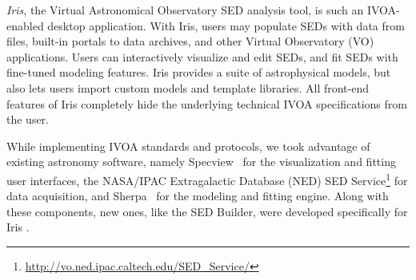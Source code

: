 \documentclass[preprint,authoryear,5p]{elsarticle}
\begin{document}
\textit{Iris}, the Virtual Astronomical Observatory \citep[VAO;][]{2012SPIE.8449E..0HB}
SED analysis tool, is such an IVOA-enabled desktop application. 
With Iris, users may populate SEDs with data from files, built-in portals to data
archives, and other Virtual Observatory (VO) applications. Users can
interactively visualize and edit SEDs, and fit SEDs with fine-tuned modeling
features. Iris provides a suite of astrophysical models, but also lets users
import custom models and template libraries. All front-end features
of Iris completely hide the underlying technical IVOA specifications from
the user.

While implementing IVOA standards and protocols, 
we took advantage of existing astronomy
software, namely
Specview~\citep{2002ASPC..281..120B} for the visualization and fitting user
interfaces, the NASA/IPAC Extragalactic Database (NED) SED 
Service\footnote{\url{http://vo.ned.ipac.caltech.edu/SED_Service/}} for data
acquisition, and Sherpa~\citep{2001SPIE.4477...76F,2009pysc.conf...51R} for the 
modeling and fitting engine. Along with these components, new ones, like the SED 
Builder, were developed specifically for Iris
\citep{2012ASPC..461..893D,2013AAS...22124038L}.



\end{document}
